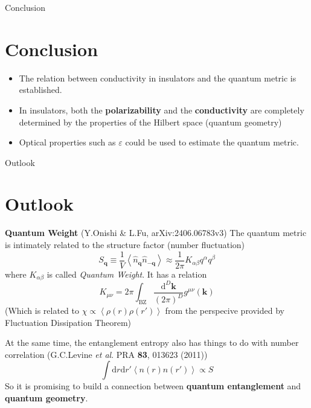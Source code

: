 \documentclass[professionalfont]{beamer}
\newcommand{\anglelr}[1]{\left\langle #1 \right\rangle}
\newcommand{\mrm}[1]{\mathrm{#1}}
\newcommand{\bo}[1]{\mathbf{#1}}
\begin{document}
\begin{frame}{Conclusion}
\section{Conclusion}
\begin{itemize}
    \item The relation between conductivity in insulators and the quantum metric is established.
    \item In insulators, both the \textbf{polarizability} and the \textbf{conductivity} are completely determined by the properties of the Hilbert space (quantum geometry)
    \item Optical properties such as $\varepsilon$ could be used to estimate the quantum metric.
\end{itemize}
\end{frame}
\begin{frame}{Outlook}
    \section{Outlook}

    {\footnotesize
    \textbf{Quantum Weight} (Y.Onishi \& L.Fu, arXiv:2406.06783v3)
    The quantum metric is intimately related to the structure factor (number fluctuation)
    \[
    S_\bo{q}\equiv \frac{1}{V}\anglelr{\hat{n}_\bo{q}\hat{n}_{-\bo{q}}} \approx \frac{1}{2\pi}K_{\alpha\beta}q^\alpha q^\beta
    \]
    where $K_{\alpha\beta}$ is called \textit{Quantum Weight}. It has a relation 
    \[
    K_{\mu\nu} = 2\pi\int_{\mrm{BZ}}\frac{\mrm{d}^D\bo{k}}{(2\pi)^D}g^{\mu\nu}(\bo{k})
    \]
    (Which is related to $\chi \propto \anglelr{\rho(r)\rho(r')}$ from the perspecive provided by Fluctuation Dissipation Theorem) 
    
    At the same time, the entanglement entropy also has things to do with number correlation (G.C.Levine \textit{et al}. PRA \textbf{83}, 013623 (2011))
    \[\int\mrm{d}r\mrm{d}r'\anglelr{n(r)n(r')}\propto S\]
    So it is promising to build a connection between \textbf{quantum entanglement} and \textbf{quantum geometry}.
    }
    
\end{frame}
\end{document}
